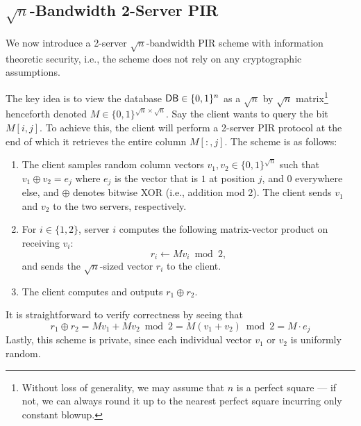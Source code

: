 \subsection{$\sqrt{n}$-Bandwidth 
2-Server PIR} %
\label{sec:sqrtnbw}

We now introduce a 2-server $\sqrt{n}$-bandwidth
PIR scheme 
with information theoretic security, i.e., 
the scheme does not rely on any cryptographic assumptions.

The key idea is to view the database ${\sf DB} \in \{0,1\}^n$ 
as a
$\sqrt{n}$ by $\sqrt{n}$ matrix\footnote{
Without loss of generality, we may assume that $n$ 
is a perfect square --- if not, we can always round it up to the 
nearest perfect square
incurring only constant blowup.}
henceforth denoted
$M \in \{0, 1\}^{\sqrt{n} \times \sqrt{n}}$.
Say the client wants to query %
the bit $M[i, j]$.
To achieve this, the client will perform
a 2-server PIR protocol
at the  end of which it retrieves
the entire column $M[:, j]$.
The scheme is as follows:
\begin{enumerate}
\item The client samples random column vectors 
$v_{1},v_{2} \in \{0, 1\}^{\sqrt{n}}$ 
such that 
$v_1 \oplus v_2 = e_j$ where $e_j$
is the vector that is $1$    
at position $j$, and $0$ everywhere else,
and $\oplus$ denotes bitwise XOR (i.e., addition mod 2).
The client sends $v_1$ and $v_2$ 
to the two servers, respectively.
	\item For $i \in \{1, 2\}$, 
server $i$ 
computes the following matrix-vector product on receiving $v_i$:
	\[r_{i} \leftarrow M v_{i} \bmod 2, \]
	and sends the $\sqrt{n}$-sized vector $r_{i}$ to the client.
	\item The client computes and outputs $r_{1} \oplus r_{2}$.
\end{enumerate}
It is straightforward to verify correctness by seeing that
\[r_{1} \oplus r_{2} = M v_{1} + M v_{2} \bmod 2 = 
M (v_{1} + v_{2}) \bmod 2 = M \cdot e_j \]
Lastly, this scheme is private, since 
each individual vector $v_{1}$ or $v_{2}$ 
is uniformly random.

